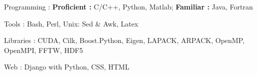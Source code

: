 


\begin{cvskills}


\cvskill
{Programming : } %
{\textbf{Proficient :}  C/C++, Python, Matlab; 
  \textbf{Familiar :} Java, Fortran} %

\cvskill
{Tools : }
{Bash, Perl, Unix: Sed \& Awk, Latex}

\cvskill
{Libraries : }
{CUDA, Cilk, Boost.Python, Eigen, LAPACK, ARPACK, OpenMP, OpenMPI, FFTW, HDF5}


\cvskill
{Web : } %
{Django with Python, CSS, HTML} %




\end{cvskills}